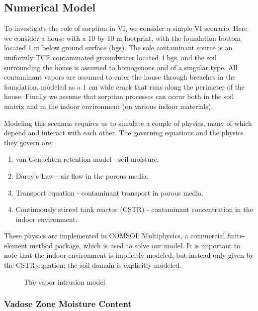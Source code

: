 
\subsection{Numerical Model}\label{sec:model}

To investigate the role of sorption in VI, we consider a simple VI scenario.
Here we consider a house with a 10 by 10 m footprint, with the foundation bottom located 1 m below ground surface (bgs).
The sole contaminant source is an uniformly TCE contaminated groundwater located 4 bgs, and the soil surrounding the house is assumed to homogenous and of a singular type.
All contaminant vapors are assumed to enter the house through breaches in the foundation, modeled as a 1 cm wide crack that runs along the perimeter of the house.
Finally we assume that sorption processes can occur both in the soil matrix and in the indoor environment (on various indoor materials).\par

Modeling this scenario requires us to simulate a couple of physics, many of which depend and interact with each other.
The governing equations and the physics they govern are:
\begin{enumerate}
  \item van Genuchten retention model - soil moisture.
  \item Darcy's Law - air flow in the porous media.
  \item Transport equation - contaminant transport in porous media.
  \item Continuously stirred tank reactor (CSTR) - contaminant concentration in the indoor environment.
\end{enumerate}
These physics are implemented in COMSOL Multiphysics, a commercial finite-element method package, which is used to solve our model.
It is important to note that the indoor environment is implicitly modeled, but instead only given by the CSTR equation; the soil domain is explicitly modeled.\par

\begin{figure}
  \caption{The vapor intrusion model}
  \label{fig:model}
\end{figure}

\subsubsection{Vadose Zone Moisture Content}

